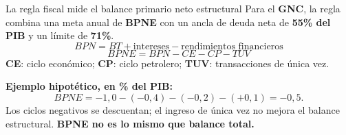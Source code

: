 \begin{frame}{La regla fiscal mide el balance primario neto estructural}
\small
Para el \textbf{GNC}, la regla combina una meta anual de \textbf{BPNE} con un ancla de deuda neta de \textbf{55\% del PIB} y un límite de \textbf{71\%}.
\[
BPN=BT+\text{intereses}-\text{rendimientos financieros}
\]
\[
\boxed{BPNE=BPN-CE-CP-TUV}
\]
\textbf{CE}: ciclo económico; \textbf{CP}: ciclo petrolero; \textbf{TUV}: transacciones de única vez.\par
\vspace{0.2cm}
\noindent\textbf{Ejemplo hipotético, en \% del PIB:}
\[
BPNE=-1{,}0-(-0{,}4)-(-0{,}2)-(+0{,}1)=\boxed{-0{,}5}.
\]
Los ciclos negativos se descuentan; el ingreso de única vez no mejora el balance estructural. \textbf{BPNE no es lo mismo que balance total.}
\end{frame}

